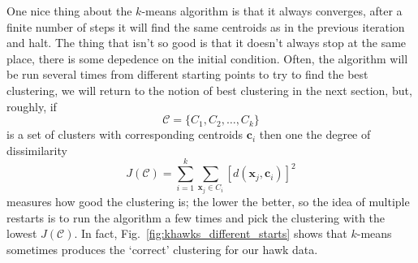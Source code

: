 \documentclass[12pt]{article}
\begin{document}
One nice thing about the $k$-means algorithm is that it always
converges, after a finite number of steps it will find the same
centroids as in the previous iteration and halt. The thing that isn't
so good is that it doesn't always stop at the same place, there is
some depedence on the initial condition. Often, the algorithm will be
run several times from different starting points to try to find the
best clustering, we will return to the notion of best clustering in
the next section, but, roughly, if
\begin{equation}
  \mathcal{C}=\{C_1,C_2,\ldots,C_k\}
\end{equation}
is a set of clusters  with corresponding centroids $\mathbf{c}_i$ then one the degree of dissimilarity
\begin{equation}
  J(\mathcal{C})=\sum_{i=1}^k\sum_{\mathbf{x}_j\in C_i}[d(\mathbf{x}_j,\mathbf{c}_i)]^2
\end{equation}
measures how good the clustering is; the lower the better, so the idea
of multiple restarts is to run the algorithm a few times and pick the
clustering with the lowest $J(\mathcal{C})$. In fact,
Fig.~\ref{fig:khawks_different_starts} shows that $k$-means sometimes
produces the `correct' clustering for our hawk data.
\end{document}
